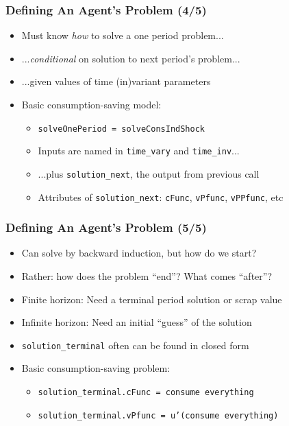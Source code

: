 \documentclass[11pt,handout]{beamer}
\newcommand{\bi}{\begin{itemize}}
\newcommand{\ei}{\end{itemize}}
\begin{document}
\begin{frame}
\frametitle{Defining An Agent's Problem (4/5)}
\bi
\item <1->Must know \textit{how} to solve a one period problem...

\item <1->...\textit{conditional} on solution to next period's problem...

\item <1->...given values of time (in)variant parameters

\item <2->Basic consumption-saving model:
\bi
\item \texttt{solveOnePeriod = solveConsIndShock}

\item Inputs are named in \texttt{time\_vary} and \texttt{time\_inv}...

\item ...plus \texttt{solution\_next}, the output from previous call

\item Attributes of \texttt{solution\_next}: \texttt{cFunc}, \texttt{vPfunc}, \texttt{vPPfunc}, etc 
\ei
\ei
\end{frame}


\begin{frame}
\frametitle{Defining An Agent's Problem (5/5)}
\bi
\item <1->Can solve by backward induction, but how do we start?

\item <1->Rather: how does the problem ``end''? What comes ``after''?

\item <2->Finite horizon: Need a terminal period solution or scrap value

\item <2->Infinite horizon: Need an initial ``guess'' of the solution

\item <3->\texttt{solution\_terminal} often can be found in closed form

\item <3->Basic consumption-saving problem:
\bi
\item \texttt{solution\_terminal.cFunc = consume everything}

\item \texttt{solution\_terminal.vPfunc = u'(consume everything)}
\ei
\ei
\end{frame}
\end{document}
